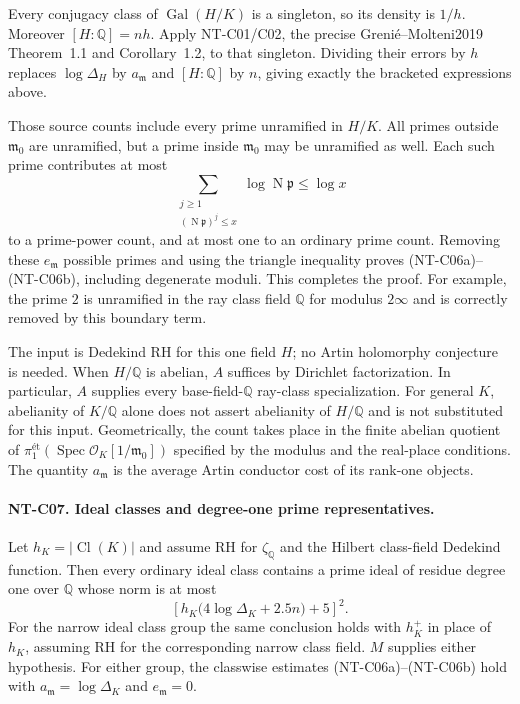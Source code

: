 \documentclass[11pt,a4paper]{article}
\begin{document}
Every conjugacy class of $\operatorname{Gal}(H/K)$ is a singleton,
so its density is $1/h$.  Moreover $[H:\mathbb Q]=nh$.
Apply NT-C01/C02, the precise Greni\'e--Molteni2019
Theorem~1.1 and Corollary~1.2, to that singleton.  Dividing their
errors by $h$ replaces $\log\Delta_H$ by
$a_{\mathfrak m}$ and $[H:\mathbb Q]$ by $n$, giving exactly
the bracketed expressions above.

Those source counts include every prime unramified in $H/K$.
All primes outside $\mathfrak m_0$ are unramified, but a prime
inside $\mathfrak m_0$ may be unramified as well.  Each such prime
contributes at most
\[
 \sum_{\substack{j\ge1\\(\operatorname N\mathfrak p)^j\le x}}
          \log\operatorname N\mathfrak p\le\log x
\]
to a prime-power count, and at most one to an ordinary prime
count.  Removing these $e_{\mathfrak m}$ possible primes and
using the triangle inequality proves (NT-C06a)--(NT-C06b), including
degenerate moduli.  This completes the proof.  For example, the
prime $2$ is unramified in the ray class field $\mathbb Q$ for
modulus $2\infty$ and is correctly removed by this boundary term.

The input is Dedekind RH for this one field $H$; no Artin
holomorphy conjecture is needed.  When $H/\mathbb Q$ is abelian,
$A$ suffices by Dirichlet factorization.  In particular, $A$
supplies every base-field-$\mathbb Q$ ray-class specialization.
For general $K$, abelianity of $K/\mathbb Q$ alone does not assert
abelianity of $H/\mathbb Q$ and is not substituted for this input.
Geometrically, the count takes place in the finite abelian
quotient of $\pi_1^{\text{ét}}(\operatorname{Spec}
\mathcal O_K[1/\mathfrak m_0])$ specified by the modulus and the
real-place conditions.  The quantity $a_{\mathfrak m}$ is the
average Artin conductor cost of its rank-one objects.

\paragraph{NT-C07. Ideal classes and degree-one prime representatives.}
Let $h_K=|\operatorname{Cl}(K)|$ and assume RH for
$\zeta_{\mathbb Q}$ and the Hilbert class-field Dedekind function.  Then every ordinary ideal class
contains a prime ideal of residue degree one over $\mathbb Q$
whose norm is at most
\[
 \left[h_K\bigl(4\log\Delta_K+2.5n\bigr)+5\right]^2.
\tag{NT-C07}
\]
For the narrow ideal class group the same conclusion holds with
$h_K^+$ in place of $h_K$, assuming RH for the corresponding
narrow class field.  $M$ supplies either hypothesis.
For either group, the classwise estimates (NT-C06a)--(NT-C06b)
hold with $a_{\mathfrak m}=\log\Delta_K$ and
$e_{\mathfrak m}=0$.
\end{document}
